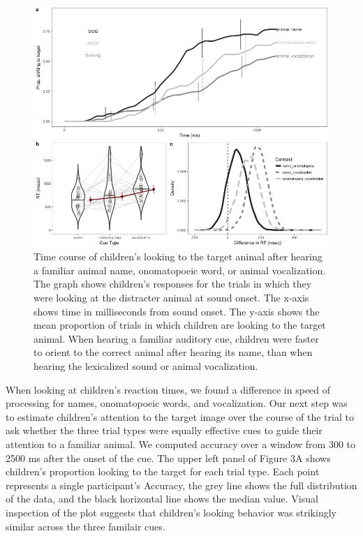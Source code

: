 \documentclass[english,floatsintext,man]{apa6}
\theoremstyle{definition}
\theoremstyle{definition}
\theoremstyle{definition}
\theoremstyle{remark}
\begin{document}
\begin{figure}
\centering
\includegraphics{anime_manuscript_files/figure-latex/oc-plot-e1-1.pdf}
\caption{\label{fig:oc-plot-e1}Time course of children's looking to the
target animal after hearing a familiar animal name, onomatopoeic word,
or animal vocalization. The graph shows children's responses for the
trials in which they were looking at the distracter animal at sound
onset. The x-axis shows time in milliseconds from sound onset. The
y-axis shows the mean proportion of trials in which children are looking
to the target animal. When hearing a familiar auditory cue, children
were faster to orient to the correct animal after hearing its name, than
when hearing the lexicalized sound or animal vocalization.}
\end{figure}

When looking at children's reaction times, we found a difference in
speed of processing for names, onomatopoeic words, and vocalization. Our
next step was to estimate children's attention to the target image over
the course of the trial to ask whether the three trial types were
equally effective cues to guide their attention to a familiar animal. We
computed accuracy over a window from 300 to 2500 ms after the onset of
the cue. The upper left panel of Figure 3A shows children's proportion
looking to the target for each trial type. Each point represents a
single participant's Accuracy, the grey line shows the full distribution
of the data, and the black horizontal line shows the median value.
Visual inspection of the plot suggests that children's looking behavior
was strikingly similar across the three familair cues.
\end{document}
